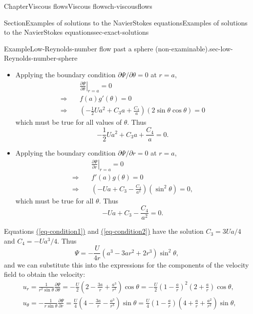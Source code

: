 \documentclass[oneside,10pt,]{book}
\newcommand{\xreffont}{\relax}
\newcommand{\ptxlistdisc}{\raisebox{0.3ex}{\textbullet}}
\numberwithin{equation}{section}
\newcommand{\pd}[2]{\frac{\partial#1}{\partial#2}}
\begin{document}
\begin{chapterptx}{Chapter}{Viscous flows}{}{Viscous flows}{}{}{ch-viscousflows}
\begin{sectionptx}{Section}{Examples of solutions to the Navier\textendash{}Stokes equations}{}{Examples of solutions to the Navier\textendash{}Stokes equations}{}{}{sec-exact-solutions}
\begin{example}{Example}{Low-Reynolds-number flow past a sphere (non-examinable).}{sec-low-Reynolds-number-sphere}
\begin{itemize}[label=\ptxlistdisc]
\begin{equation*}
f(r)=-\frac12Ur^2+C_3r+\frac{C_4}{r}.
\end{equation*}
%
\item{}Applying the boundary condition \(\partial\Psi/\partial\theta=0\) at \(r=a\),%
\begin{align*}
&\left.\pd{\Psi}{\theta}\right|_{r=a}=0\\
\Rightarrow\quad&f(a)g'(\theta)=0\\
\Rightarrow\quad&\left(-\frac12Ua^2+C_3a+\frac{C_4}{a}\right)
\left(2\sin\theta\cos\theta\right)=0
\end{align*}
which must be true for all values of \(\theta\). Thus%
\begin{equation}
-\frac12Ua^2+C_3a+\frac{C_4}{a}=0.\label{eq-condition1}
\end{equation}
%
\item{}Applying the boundary condition \(\partial\Psi/\partial r=0\) at \(r=a\),%
\begin{align*}
&\left.\pd{\Psi}{r}\right|_{r=a}=0\\
\Rightarrow\quad&f'(a)g(\theta)=0\\
\Rightarrow\quad&\left(-Ua+C_3-\frac{C_4}{a^2}\right)\left(\sin^2\theta\right)=0,
\end{align*}
which must be true for all \(\theta\). Thus%
\begin{equation}
-Ua+C_3-\frac{C_4}{a^2}=0.\label{eq-condition2}
\end{equation}
%
\end{itemize}
Equations \hyperref[eq-condition1]{({\xreffont\ref{eq-condition1}})} and \hyperref[eq-condition2]{({\xreffont\ref{eq-condition2}})} have the solution \(C_3=3Ua/4\) and \(C_4=-Ua^3/4\). Thus%
\begin{equation*}
\Psi=-\frac{U}{4r}\left(a^3-3ar^2+2r^3\right)\sin^2\theta,
\end{equation*}
and we can substitute this into the expressions for the components of the velocity field to obtain the velocity:%
\begin{align*}
&u_r=\frac1{r^2\sin\theta}\pd{\Psi}{\theta}
=-\frac{U}{2}\left(2-\frac{3a}{r}+\frac{a^3}{r^3}\right)\cos\theta
=-\frac{U}{2}\left(1-\frac{a}{r}\right)^2\left(2+\frac{a}{r}\right)\cos\theta,\\
&u_\theta=-\frac1{r\sin\theta}\pd{\Psi}{r}
=\frac{U}{4}\left(4-\frac{3a}{r}-\frac{a^3}{r^3}\right)\sin\theta
=\frac{U}{4}\left(1-\frac{a}{r}\right)\left(4+\frac{a}{r}+\frac{a^2}{r^2}\right)\sin\theta,\\

\end{align*}
\end{example}
\end{sectionptx}
\end{chapterptx}
\end{document}
